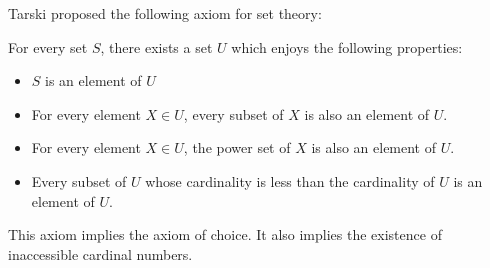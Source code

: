\documentclass[12pt]{article}
\begin{document}
Tarski proposed the following axiom for set theory:

For every set $S$, there exists a set $U$ which enjoys the following properties:

\begin{itemize}
\item $S$ is an element of $U$
\item For every element $X \in U$, every subset of $X$ is also an element of $U$.
\item For every element $X \in U$, the power set of $X$ is also an element of $U$.
\item Every subset of $U$ whose cardinality is less than the cardinality of $U$ is  an element of $U$.
\end{itemize}

This axiom implies the axiom of choice.  It also implies the existence of inaccessible cardinal numbers.
\end{document}

